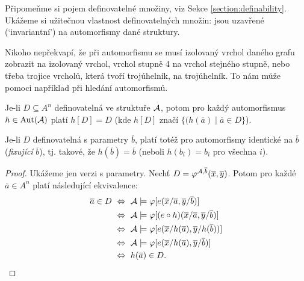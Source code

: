 Připomeňme si pojem definovatelné množiny, viz Sekce \ref{section:definability}. Ukážeme si užitečnou vlastnost definovatelných množin: jsou uzavřené (`invariantní') na automorfismy dané struktury.

Nikoho nepřekvapí, že při automorfismu se musí izolovaný vrchol daného grafu zobrazit na izolovaný vrchol, vrchol stupně 4 na vrchol stejného stupně, nebo třeba trojice vrcholů, která tvoří trojúhelník, na trojúhelník. To nám může pomoci například při hledání automorfismů.

\begin{proposition}
    Je-li $D\subseteq A^n$ definovatelná ve struktuře $\mathcal{A}$, potom pro každý automorfismus $h\in\operatorname{Aut}(\mathcal{A})$ platí $h[D]=D$ (kde $h[D]$ značí $\{(h(\overline{a})\mid\overline{a}\in D\}$).

    Je-li $D$ definovatelná s parametry $\overline{b}$, platí totéž pro automorfismy identické na $\overline{b}$ (\emph{fixující} $\overline{b}$), tj. takové, že $h(\overline{b})=\overline{b}$ (neboli $h(b_i)=b_i$ pro všechna $i$).
\end{proposition}
\begin{proof}
    Ukážeme jen verzi s parametry. Nechť $D=\varphi^{\mathcal{A},\overline{b}}(\overline{x},\overline{y})$. Potom pro každé $\overline{a}\in A^n$ platí následující ekvivalence:
\begin{align*}
\overline{a}\in D\
&\Leftrightarrow\ \mathcal{A}\models \varphi[e(\overline{x}/\overline{a},\overline{y}/\overline{b})]\\
&\Leftrightarrow\  \mathcal{A}\models \varphi[(e\circ h)(\overline{x}/\overline{a},\overline{y}/\overline{b})]\\
&\Leftrightarrow\ \mathcal{A}\models \varphi[e(\overline{x}/h(\overline{a}),\overline{y}/h(\overline{b}))]\\
&\Leftrightarrow\ \mathcal{A}\models \varphi[e(\overline{x}/h(\overline{a}),\overline{y}/\overline{b})]\\
&\Leftrightarrow\ h(\overline{a})\in D.
\end{align*}
\end{proof}

